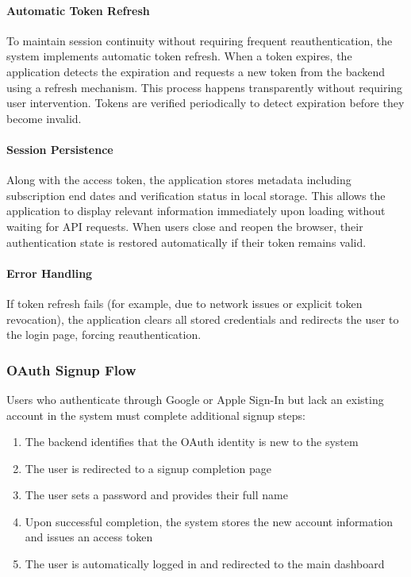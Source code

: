 \paragraph{Automatic Token Refresh}

To maintain session continuity without requiring frequent reauthentication, the system implements automatic token refresh. When a token expires, the application detects the expiration and requests a new token from the backend using a refresh mechanism. This process happens transparently without requiring user intervention. Tokens are verified periodically to detect expiration before they become invalid.

\paragraph{Session Persistence}

Along with the access token, the application stores metadata including subscription end dates and verification status in local storage. This allows the application to display relevant information immediately upon loading without waiting for API requests. When users close and reopen the browser, their authentication state is restored automatically if their token remains valid.

\paragraph{Error Handling}

If token refresh fails (for example, due to network issues or explicit token revocation), the application clears all stored credentials and redirects the user to the login page, forcing reauthentication.

\subsubsection{OAuth Signup Flow}

Users who authenticate through Google or Apple Sign-In but lack an existing account in the system must complete additional signup steps:

\begin{enumerate}
    \item The backend identifies that the OAuth identity is new to the system
    \item The user is redirected to a signup completion page
    \item The user sets a password and provides their full name
    \item Upon successful completion, the system stores the new account information and issues an access token
    \item The user is automatically logged in and redirected to the main dashboard
\end{enumerate}

